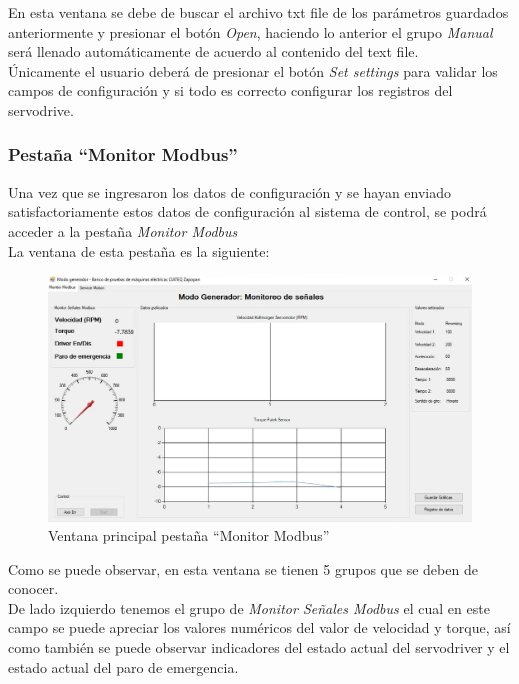 \documentclass[12pt,titlepage]{article}
\begin{document}
En esta ventana se debe de buscar el archivo txt file de los parámetros guardados anteriormente y  presionar el botón \textit{Open}, haciendo lo anterior el grupo \textit{Manual} será llenado automáticamente de acuerdo al contenido del text file. \\ 

Únicamente el usuario deberá de presionar el botón \textit{Set settings} para validar los campos de configuración y si todo es correcto configurar los registros del servodrive. \\ 
\newpage
\subsubsection{Pestaña ``Monitor Modbus'' }
Una vez que se ingresaron los datos de configuración y se hayan enviado satisfactoriamente estos datos de configuración al sistema de control, se podrá acceder a la pestaña \textit{Monitor Modbus}\\

La ventana de esta pestaña es la siguiente: \\ 
\begin{figure}[htbp]
\hspace*{0.2cm} 
\includegraphics[scale=0.55]{Monitor_modbus}
\caption{Ventana principal pestaña  ``Monitor Modbus'' }
\end{figure}

Como se puede observar, en esta ventana se tienen 5 grupos que se deben de conocer. \\

De lado izquierdo tenemos el grupo de \textit{Monitor Señales Modbus} el cual en este campo se puede apreciar los valores numéricos del valor de velocidad y torque, así como también se puede observar indicadores del estado actual del servodriver y el estado actual del paro de emergencia. \\
\end{document}
